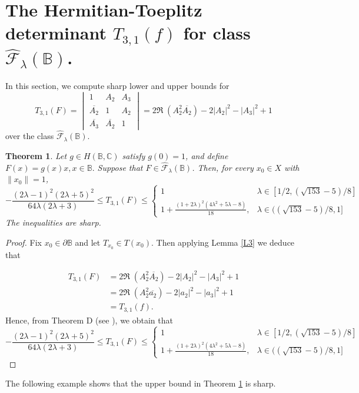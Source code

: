 \documentclass[11pt, reqno]{amsart}
\newtheorem{theo}{Theorem}[section]
\numberwithin{equation}{section}
\begin{document}
 
\section{{\bf The Hermitian-Toeplitz determinant $T_{3,1}(f)$ for class $\widehat{\mathcal{F}}_{\lambda}(\mathbb{B})$.}}
In this section, we compute sharp lower and upper bounds for 
\[T_{3,1}(F)=
\begin{vmatrix}
1 & A_{2} &A_3\\
\overline{A_{2}} & 1 & A_2 \\
\overline{A_3}& \overline{A_2} & 1
\end{vmatrix}=2\Re\;(A_2^2\overline{A_2})-2|A_2|^2-|A_3|^2+1\]
over the class $\widehat{\mathcal{F}}_{\lambda}(\mathbb{B})$.

\begin{theo}\label{HT1}
Let $g\in H(\mathbb{B},\mathbb{C})$ satisfy $g(0)=1$, and define $F(x)=g(x)x, x\in\mathbb{B}.$
Suppose that $F\in\widehat{\mathcal{F}}_{\lambda}(\mathbb{B})$. Then, for every
$x_{0}\in X$ with $\|x_{0}\|=1$,
\[
-\frac{(2\lambda-1)^2(2\lambda+5)^2}{64\lambda(2\lambda+3)}\leq T_{3,1}(F)\leq  \begin{cases} 1 &\lambda\in [1/2, (\sqrt{153}-5)/8]\\
1+\frac{(1+2\lambda)^2(4\lambda^2+5\lambda-8)}{18}, &\lambda\in ((\sqrt{153}-5)/8,1]
\end{cases}
\]
 The inequalities are sharp.
\end{theo}
\begin{proof} Fix $x_0\in \partial{\mathbb{B}}$ and let $T_{x_0}\in T(x_0)$. Then applying Lemma \ref{L3} we deduce that 

\begin{align*}
T_{3,1}(F)
&=2\Re\;(A_2^2\overline{A_2})-2|A_2|^2-|A_3|^2+1\\
&=2\Re\;(A_2^2\overline{a_2})-2|a_2|^2-|a_3|^2+1\\
&=T_{3,1}(f).
\end{align*}
Hence, from Theorem D (see \cite[Theorem 5.1]{ALT2022}), we obtain that
\[
-\frac{(2\lambda-1)^2(2\lambda+5)^2}{64\lambda(2\lambda+3)}\leq T_{3,1}(F)\leq 
\begin{cases} 1 &\lambda\in [1/2, (\sqrt{153}-5)/8]\\
1+\frac{(1+2\lambda)^2(4\lambda^2+5\lambda-8)}{18}, &\lambda\in ((\sqrt{153}-5)/8,1]
\end{cases}
\]

\end{proof}
The following example shows that the upper bound in Theorem \ref{HT1} is sharp.
\end{document}
